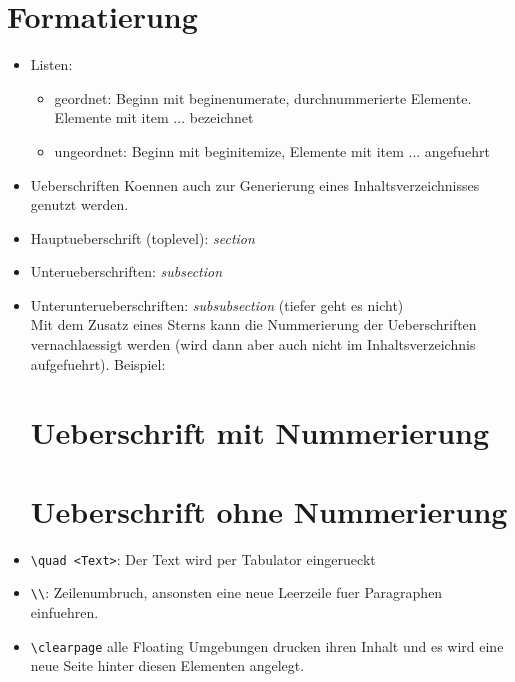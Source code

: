 \documentclass[11pt]{report}
\begin{document}
\section{Formatierung}
\begin{itemize}
  \item Listen: 
  \begin{itemize}
  \item geordnet: Beginn mit begin{enumerate}, durchnummerierte Elemente. Elemente mit item ... bezeichnet
  \item ungeordnet: Beginn mit begin{itemize}, Elemente mit item ... angefuehrt
\end{itemize}

\item Ueberschriften
Koennen auch zur Generierung eines Inhaltsverzeichnisses genutzt werden. 
  \item Hauptueberschrift (toplevel): \emph{section}
  \item Unterueberschriften: \emph{subsection}
  \item Unterunterueberschriften: \emph{subsubsection} (tiefer geht es nicht)
  \\Mit dem Zusatz eines Sterns kann die Nummerierung der Ueberschriften vernachlaessigt werden (wird dann aber auch nicht im Inhaltsverzeichnis aufgefuehrt).
  Beispiel: 
  \begin{verbatim*} 
\section{Ueberschrift mit Nummerierung}
\section*{Ueberschrift ohne Nummerierung}
  \end{verbatim*}

  \item \verb|\quad <Text>|: Der Text wird per Tabulator eingerueckt
  \item \verb|\\|: Zeilenumbruch, ansonsten eine neue Leerzeile fuer Paragraphen einfuehren.
  \item \verb|\clearpage| alle Floating Umgebungen drucken ihren Inhalt und es wird eine neue Seite hinter diesen Elementen angelegt.
\end{itemize}
\end{document}
